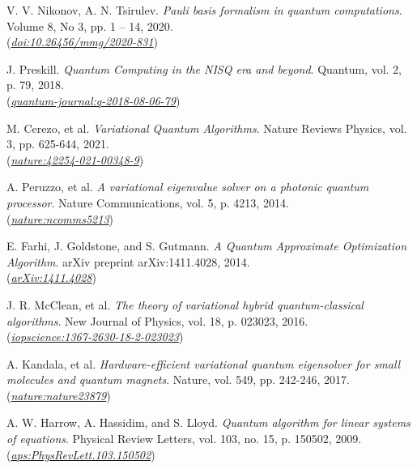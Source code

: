 \documentclass[a4paper]{report}
\begin{document}
\begin{thebibliography}{99}
    V. V. Nikonov, A. N. Tsirulev. \textit{Pauli basis formalism in quantum computations}. Volume 8, No 3, pp. 1 – 14, 2020.\\
    (\href{https:doi.org/10.26456/mmg/2020-831} {\textit{doi:10.26456/mmg/2020-831}})

    J. Preskill. \textit{Quantum Computing in the NISQ era and beyond}. Quantum, vol. 2, p. 79, 2018.\\
    (\href{https://quantum-journal.org/papers/q-2018-08-06-79/}{\textit{quantum-journal:q-2018-08-06-79}})

    M. Cerezo, et al. \textit{Variational Quantum Algorithms}. Nature Reviews Physics, vol. 3, pp. 625-644, 2021.\\
    (\href{https://www.nature.com/articles/s42254-021-00348-9}{\textit{nature:42254-021-00348-9}})

    A. Peruzzo, et al. \textit{A variational eigenvalue solver on a photonic quantum processor}. Nature Communications, vol. 5, p. 4213, 2014.\\
    (\href{https://www.nature.com/articles/ncomms5213}{\textit{nature:ncomms5213}})

    E. Farhi, J. Goldstone, and S. Gutmann. \textit{A Quantum Approximate Optimization Algorithm}. arXiv preprint arXiv:1411.4028, 2014.\\
    (\href{https://arxiv.org/abs/1411.4028}{\textit{arXiv:1411.4028}})

    J. R. McClean, et al. \textit{The theory of variational hybrid quantum-classical algorithms}. New Journal of Physics, vol. 18, p. 023023, 2016.\\
    (\href{https://iopscience.iop.org/article/10.1088/1367-2630/18/2/023023}{\textit{iopscience:1367-2630-18-2-023023}})

    A. Kandala, et al. \textit{Hardware-efficient variational quantum eigensolver for small molecules and quantum magnets}. Nature, vol. 549, pp. 242-246, 2017.\\
    (\href{https://www.nature.com/articles/nature23879}{\textit{nature:nature23879}})

    A. W. Harrow, A. Hassidim, and S. Lloyd. \textit{Quantum algorithm for linear systems of equations}. Physical Review Letters, vol. 103, no. 15, p. 150502, 2009.\\
    (\href{https://journals.aps.org/prl/abstract/10.1103/PhysRevLett.103.150502}{\textit{aps:PhysRevLett.103.150502}})


\end{thebibliography}
\end{document}
